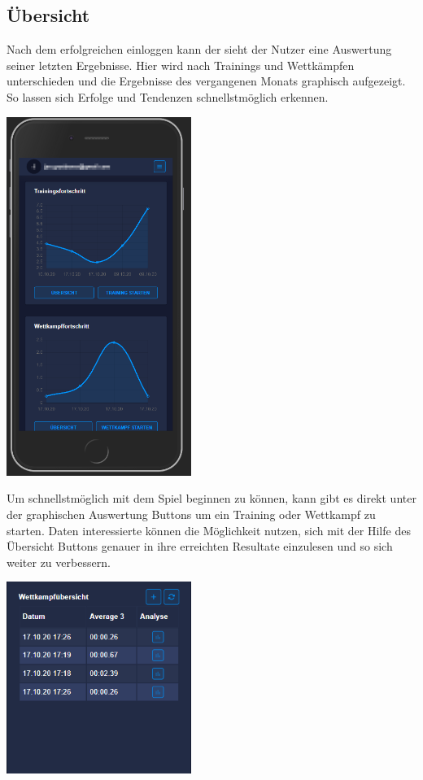 \documentclass[a4paper]{article}
\begin{document}
	\subsection*{Übersicht}
	Nach dem erfolgreichen einloggen kann der sieht der Nutzer eine Auswertung seiner letzten Ergebnisse. Hier wird nach Trainings und Wettkämpfen unterschieden und die Ergebnisse des vergangenen Monats graphisch aufgezeigt. So lassen sich Erfolge und Tendenzen schnellstmöglich erkennen.
	\begin{center}
		\includegraphics[width= 6cm, keepaspectratio]{img/overview}
	\end{center} 
	Um schnellstmöglich mit dem Spiel beginnen zu können, kann gibt es direkt unter der graphischen Auswertung Buttons um ein Training oder Wettkampf zu starten. Daten interessierte können die Möglichkeit nutzen, sich mit der Hilfe des Übersicht Buttons genauer in ihre erreichten Resultate einzulesen und so sich weiter zu verbessern. 
	\begin{center}
		\includegraphics[width= 6cm, keepaspectratio]{img/competitionoverview}
	\end{center}
\end{document}

